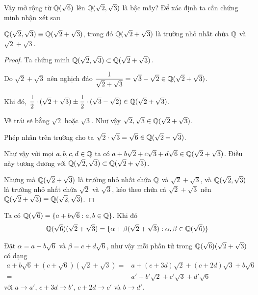 Vậy mở rộng từ $\mathbb{Q}(\sqrt{6})$ lên $\mathbb{Q}(\sqrt{2}, \sqrt{3})$ là bậc mấy? Để xác định ta cần chứng minh nhận xét sau

\begin{remark}
    $\mathbb{Q}(\sqrt{2}, \sqrt{3}) \equiv \mathbb{Q}(\sqrt{2} + \sqrt{3})$, trong đó $\mathbb{Q}(\sqrt{2} + \sqrt{3})$ là trường nhỏ nhất chứa $\mathbb{Q}$ và $\sqrt{2} + \sqrt{3}$.
\end{remark}

\begin{proof}
    Ta chứng minh $\mathbb{Q}(\sqrt{2}, \sqrt{3}) \subset \mathbb{Q}(\sqrt{2} + \sqrt{3})$.

    Do $\sqrt{2} + \sqrt{3}$ nên nghịch đảo $\dfrac{1}{\sqrt{2} + \sqrt{3}} = \sqrt{3} - \sqrt{2} \in \mathbb{Q}(\sqrt{2} + \sqrt{3})$.

    Khi đó, $\dfrac{1}{2} \cdot (\sqrt{2} + \sqrt{3}) \pm \dfrac{1}{2} \cdot (\sqrt{3} - \sqrt{2}) \in \mathbb{Q}(\sqrt{2} + \sqrt{3})$.

    Vế trái sẽ bằng $\sqrt{2}$ hoặc $\sqrt{3}$. Như vậy $\sqrt{2}, \sqrt{3} \in \mathbb{Q}(\sqrt{2} + \sqrt{3})$.

    Phép nhân trên trường cho ta $\sqrt{2} \cdot \sqrt{3} = \sqrt{6} \in \mathbb{Q}(\sqrt{2} + \sqrt{3})$.

    Như vậy với mọi $a, b, c, d \in \mathbb{Q}$ ta có $a + b \sqrt{2} + c \sqrt{3} + d \sqrt{6} \in \mathbb{Q}(\sqrt{2} + \sqrt{3})$. Điều này tương đương với $\mathbb{Q}(\sqrt{2}, \sqrt{3}) \subset \mathbb{Q}(\sqrt{2} + \sqrt{3})$.

    Nhưng mà $\mathbb{Q}(\sqrt{2} + \sqrt{3})$ là trường nhỏ nhất chứa $\mathbb{Q}$ và $\sqrt{2} + \sqrt{3}$, và $\mathbb{Q}(\sqrt{2}, \sqrt{3})$ là trường nhỏ nhất chứa $\sqrt{2}$ và $\sqrt{3}$, kéo theo chứa cả $\sqrt{2} + \sqrt{3}$ nên $\mathbb{Q}(\sqrt{2} + \sqrt{3}) \equiv \mathbb{Q}(\sqrt{2}, \sqrt{3})$.
\end{proof}

Ta có $\mathbb{Q}(\sqrt{6}) = \{ a + b \sqrt{6} : a, b \in \mathbb{Q} \}$. Khi đó
\begin{equation}
    \label{QQ6_to_QQ2+3}
    \mathbb{Q}(\sqrt{6})(\sqrt{2} + \sqrt{3}) = \{ \alpha + \beta (\sqrt{2} + \sqrt{3}) : \alpha, \beta \in \mathbb{Q}(\sqrt{6}) \}
\end{equation}

Đặt $\alpha = a + b \sqrt{6}$ và $\beta = c + d \sqrt{6}$, như vậy mỗi phần tử trong $\mathbb{Q}(\sqrt{6})(\sqrt{2} + \sqrt{3})$ có dạng
\begin{align*}
    a + b \sqrt{6} + (c + \sqrt{6})(\sqrt{2} + \sqrt{3}) = & a + (c + 3d) \sqrt{2} + (c + 2d) \sqrt{3} + b \sqrt{6} \\
        = & a' + b' \sqrt{2} + c' \sqrt{3} + d' \sqrt{6}
\end{align*}
với $a \to a'$, $c+3d \to b'$, $c + 2d \to c'$ và $b \to d'$.

